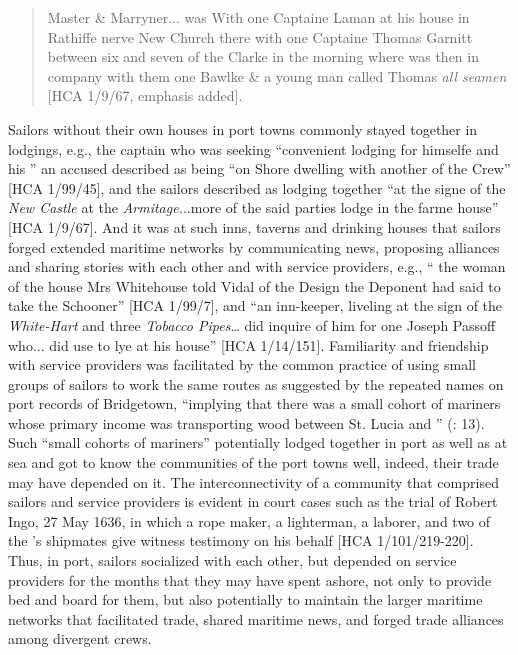 \begin{quotation}
Master \& Marryner... was With one Captaine Laman at his house in Rathiffe nerve New Church there with one Captaine Thomas Garnitt between six and seven of the Clarke in the morning where was then in company with them one Bawlke \& a young man called Thomas \textit{all seamen} [HCA 1/9/67, emphasis added]. 
\end{quotation}

Sailors without their own houses in port towns commonly stayed together in lodgings, e.g., the captain who was seeking “convenient lodging for himselfe and his ” \citep[11,]{Gage1648} an accused  described as being “on Shore dwelling with another of the Crew” [HCA 1/99/45], and the sailors described as lodging together “at the signe of the \textit{New Castle} at the \textit{Armitage.}..more of the said parties lodge in the farme house” [HCA 1/9/67]. And it was at such inns, taverns and drinking houses that sailors forged extended maritime networks by communicating news, proposing alliances and sharing stories with each other and with service providers, e.g., “ the woman of the house Mrs Whitehouse told Vidal of the Design the Deponent had said to take the Schooner” [HCA 1/99/7], and “an inn-keeper, liveling at the sign of the \textit{White-Hart} and three \textit{Tobacco Pipes}… did inquire of him for one Joseph Passoff who... did use to lye at his house” [HCA 1/14/151]. Familiarity and friendship with service providers was facilitated by the common practice of using small groups of sailors to work the same routes as suggested by the repeated names on port records of Bridgetown, “implying that there was a small cohort of mariners whose primary income was transporting wood between St. Lucia and ” (\citealt{Draper2016}: 13). Such “small cohorts of mariners” potentially lodged together in port as well as at sea and got to know the communities of the port towns well, indeed, their trade may have depended on it. The interconnectivity of a community that comprised sailors and service providers is evident in court cases such as the trial of Robert Ingo, 27 May {1636}, in which a rope maker, a lighterman, a laborer, and two of the ’s shipmates give witness testimony on his behalf [HCA 1/101/219-220]. Thus, in port, sailors socialized with each other, but depended on service providers for the months that they may have spent ashore, not only to provide bed and board for them, but also potentially to maintain the larger maritime networks that facilitated trade, shared maritime news, and forged trade alliances among divergent crews. 

